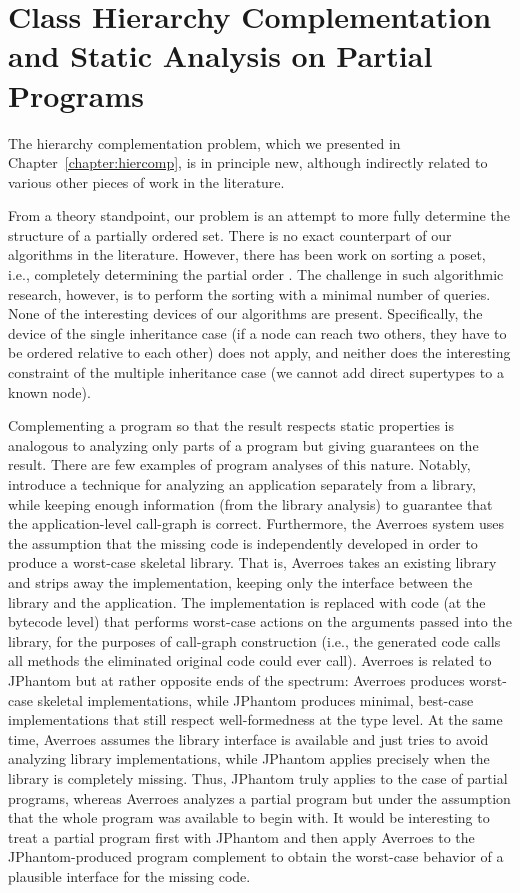 \section{Class Hierarchy Complementation and Static Analysis on
  Partial Programs}
\label{related:sect/hiercomp}

The hierarchy complementation problem, which we presented in
Chapter~\ref{chapter:hiercomp}, is in principle new, although
indirectly related to various other pieces of work in the literature.

From a theory standpoint, our problem is an attempt to more fully
determine the structure of a partially ordered set. There is no exact
counterpart of our algorithms in the literature. However, there has
been work on sorting a poset, i.e., completely determining the partial
order \cite{soda/DaskalakisKMRV09}.  The challenge in such algorithmic
research, however, is to perform the sorting with a minimal number of
queries. None of the interesting devices of our algorithms are
present. Specifically, the device of the single inheritance case (if a
node can reach two others, they have to be ordered relative to each
other) does not apply, and neither does the interesting constraint of
the multiple inheritance case (we cannot add direct supertypes to a
known node).

Complementing a program so that the result respects static properties
is analogous to analyzing only parts of a program but giving
guarantees on the result. There are few examples of program analyses
of this nature. Notably, \citeauthor{ecoop/AliL12} introduce
a technique \cite{ecoop/AliL12} for analyzing an application
separately from a library, while keeping enough information (from the
library analysis) to guarantee that the application-level call-graph
is correct. Furthermore, the Averroes system \cite{ecoop/AliL13} uses
the assumption that the missing code is independently developed in
order to produce a worst-case skeletal library. That is, Averroes
takes an existing library and strips away the implementation, keeping
only the interface between the library and the application. The
implementation is replaced with code (at the bytecode level) that
performs worst-case actions on the arguments passed into the library,
for the purposes of call-graph construction (i.e., the generated code
calls all methods the eliminated original code could ever
call). Averroes is related to JPhantom but at rather opposite ends of
the spectrum: Averroes produces worst-case skeletal implementations,
while JPhantom produces minimal, best-case implementations that still
respect well-formedness at the type level.  At the same time, Averroes
assumes the library interface is available and just tries to avoid
analyzing library implementations, while JPhantom applies precisely
when the library is completely missing. Thus, JPhantom truly applies
to the case of partial programs, whereas Averroes analyzes a partial
program but under the assumption that the whole program was available
to begin with. It would be interesting to treat a partial program
first with JPhantom and then apply Averroes to the JPhantom-produced
program complement to obtain the worst-case behavior of a plausible
interface for the missing code.

